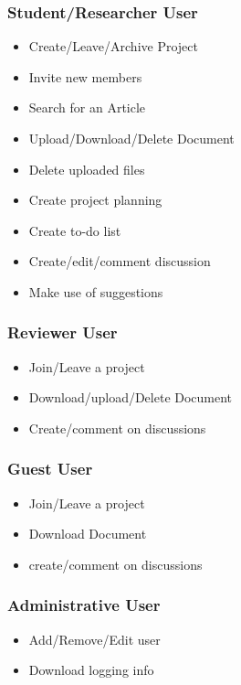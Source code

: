\subsubsection{Student/Researcher User} 
\begin{itemize}
	\item Create/Leave/Archive Project
	\item Invite new members
	\item Search for an Article
	\item Upload/Download/Delete Document
	\item Delete uploaded files
	\item Create project planning
	\item Create to-do list
	\item Create/edit/comment discussion
	\item Make use of suggestions

\end{itemize}
\subsubsection{Reviewer User} 
\begin{itemize}
	 

	\item Join/Leave a project
	\item Download/upload/Delete Document
	\item Create/comment on discussions
\end{itemize}

\subsubsection{Guest User} 
\begin{itemize}
	
	\item Join/Leave a project
	\item Download Document
	\item create/comment on discussions
\end{itemize}	
\subsubsection{Administrative User} 
\begin{itemize}
	\item Add/Remove/Edit user	\item Download logging info
\end{itemize}
